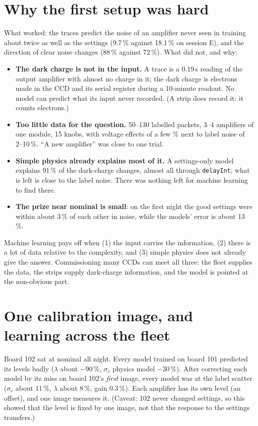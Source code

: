 \documentclass[11pt]{article}
\newcommand{\se}{\sigma_e}
\begin{document}
\section{Why the first setup was hard}\label{sec:why}
What worked: the traces predict the noise of an amplifier never seen in training about twice as well as the settings
(9.7\,\% against 18.1\,\% on session E), and the direction of clear noise changes (88\,\% against 72\,\%).
What did not, and why:
\begin{itemize}
\item \textbf{The dark charge is not in the input.} A trace is a 0.19\,s reading of the output amplifier with almost no
  charge in it; the dark charge is electrons made in the CCD and its serial register during a 10-minute readout. No
  model can predict what its input never recorded. (A strip does record it: it counts electrons.)
\item \textbf{Too little data for the question.} 50--130 labelled packets, 3--4 amplifiers of one module, 15 knobs, with
  voltage effects of a few \% next to label noise of 2--10\,\%. ``A new amplifier'' was close to one trial.
\item \textbf{Simple physics already explains most of it.} A settings-only model explains 91\,\% of the dark-charge
  changes, almost all through \texttt{delayInt}; what is left is close to the label noise. There was nothing left for
  machine learning to find there.
\item \textbf{The prize near nominal is small}: on the first night the good settings were within about 3\,\% of each
  other in noise, while the models' error is about 13\,\%.
\end{itemize}
Machine learning pays off when (1) the input carries the information, (2) there is a lot of data relative to the
complexity, and (3) simple physics does not already give the answer. Commissioning many CCDs can meet all three: the
fleet supplies the data, the strips supply dark-charge information, and the model is pointed at the non-obvious part.

\section{One calibration image, and learning across the fleet}
Board 102 sat at nominal all night. Every model trained on board 101 predicted its levels badly ($\lambda$ about $-90$\,\%,
$\se$ physics model $-30$\,\%). After correcting each model by its miss on board 102's \emph{first} image, every model was
at the label scatter ($\se$ about 11\,\%, $\lambda$ about 8\,\%, gain 0.3\,\%). Each amplifier has its own level (an
offset), and one image measures it. (Caveat: 102 never changed settings, so this showed that the level is fixed by one
image, not that the response to the settings transfers.)
\end{document}
